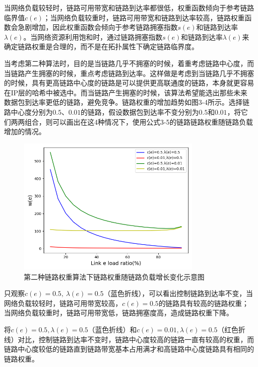 当网络负载较轻时，链路可用带宽和链路到达率都很低，权重函数倾向于参考链路临界值$c\left(e\right)$；当网络负载较重时，链路可用带宽和链路到达率较高，链路权重函数会急剧增加，因此权重函数会倾向于参考链路拥塞指数$s\left(e\right)$和链路到达率$\lambda\left(e\right)$。当网络资源利用饱和时，通过链路拥塞指数$s\left(e\right)$和链路到达率$\lambda\left(e\right)$来确定链路权重是合理的，而不是在拓扑属性下确定链路临界度。

当考虑第二种算法时，目的是当链路几乎不拥塞的时候，着重考虑链路中心度，而当链路产生拥塞的时候，重点考虑链路到达率。这样做是考虑到当链路几乎不拥塞的时候，具有更高链路中心度的链路是可以提供更高联通度的链路，本身就更容易在IP层的哈希中被选中。而当链路产生拥塞的时候，该算法希望能选出那些未来数据包到达率更低的链路，避免竞争。链路权重的增加趋势如图3-4所示。选择链路中心度分别为$0.5$、$0.01$的链路，假设数据包到达率不变分别为$0.5$和$0.01$，将它们两两组合，则可以画出在这4种情况下，使用公式3-5的链路链路权重随链路负载增加的情况。

\begin{figure}[htbp]
\setlength{\abovecaptionskip}{15pt plus 3pt minus 2pt}
\centerline{\includegraphics[width=0.8\textwidth]{./figures/ch3-link-weight-function-2.png}}
\caption{第二种链路权重算法下链路权重随链路负载增长变化示意图}
\label{fig-ch3-link-weight-function-2}
\end{figure}

只观察$c(e)=0.5,\ \lambda(e)=0.5$（蓝色折线），可以看出控制链路到达率不变，当网络负载较轻时，链路可用带宽较高，$c(e)=0.5$的链路具有较高的链路权重；当网络负载较重时，链路可用带宽低，链路拥塞度高，造成链路权重下降。

将$c(e)=0.5,\lambda(e)=0.5$（蓝色折线）和$c\left(e\right)=0.01,\lambda\left(e\right)=0.5$（红色折线）对比，控制链路到达率不变时，链路中心度较高的链路一直有较高的权重，而链路中心度较低的链路直到链路带宽基本占用满才和高链路中心度链路具有相同的链路权重。

